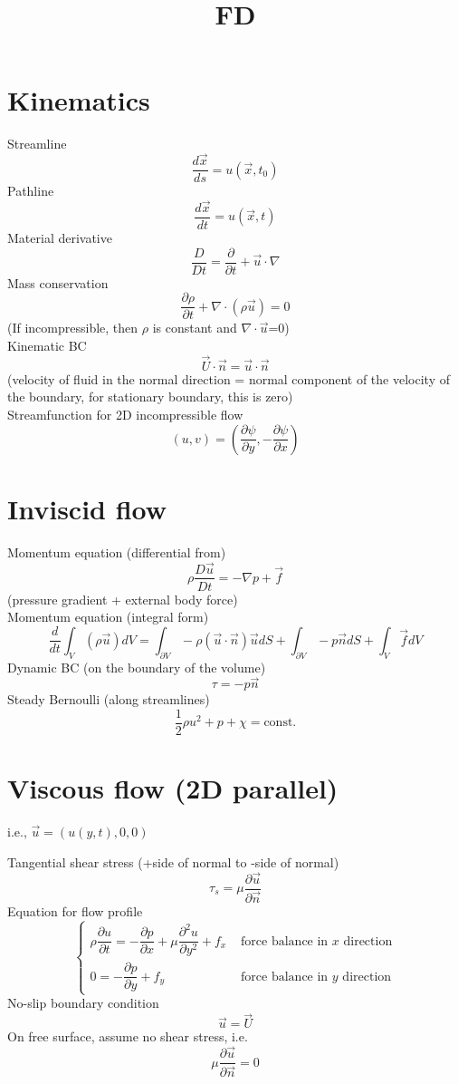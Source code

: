 \documentclass{article}
\title{FD}
\author{ }
\date{ }
\theoremstyle{definition}
\theoremstyle{remark}
\theoremstyle{plain}
\theoremstyle{definition}
\begin{document}
\maketitle
\section{Kinematics}
Streamline
\[\dfrac{d\vec x}{ds}=u(\vec x,t_0)\]
Pathline
\[\dfrac{d\vec x}{dt}=u(\vec x,t)\]
Material derivative
\[\dfrac{D}{Dt}=\dfrac{\partial}{\partial t}+\vec u\cdot \nabla\]
Mass conservation
\[\dfrac{\partial\rho}{\partial t}+\nabla\cdot(\rho\vec u)=0\]
(If incompressible, then $\rho$ is constant and $\nabla\cdot \vec u$=0)\\
Kinematic BC
\[\vec U\cdot \vec n= \vec u\cdot \vec n\]
(velocity of fluid in the normal direction = normal component of the velocity of the boundary, for stationary boundary, this is zero)\\
Streamfunction for 2D incompressible flow
\[(u,v)=(\dfrac{\partial\psi}{\partial y},-\dfrac{\partial\psi}{\partial x})\]
\section{Inviscid flow}
Momentum equation (differential from)
\[\rho\dfrac{D\vec u}{Dt}=-\nabla p+\vec f\]
(pressure gradient + external body force)\\
Momentum equation (integral form)
\[\dfrac{d}{dt}\int_V(\rho \vec u)dV=\int_{\partial V}-\rho (\vec u\cdot \vec n)\vec u dS +\int_{\partial V}-p\vec n dS+\int_V \vec f dV\]
Dynamic BC (on the boundary of the volume)
\[\tau=-p\vec n\]
Steady Bernoulli (along streamlines)
\[\dfrac{1}{2}\rho u^2+p+\chi=\text{const.}\]
\section{Viscous flow (2D parallel)}
i.e., $\vec u=(u(y,t),0,0)$

Tangential shear stress (+side of normal to -side of normal)
\[\tau_s=\mu\dfrac{\partial \vec u}{\partial \vec n}\]
Equation for flow profile
\[\begin{cases}
\rho\dfrac{\partial u}{\partial t}=-\dfrac{\partial p}{\partial x}+\mu\dfrac{\partial^2 u}{\partial y^2}+f_x & \text{ force balance in }x\text{ direction}\\
0=-\dfrac{\partial p}{\partial y}+f_y & \text{ force balance in }y\text{ direction}
\end{cases}\]
No-slip boundary condition
\[\vec u=\vec U\]
On free surface, assume no shear stress, i.e.
\[\mu\dfrac{\partial \vec u}{\partial \vec n}=0\]
\end{document}
